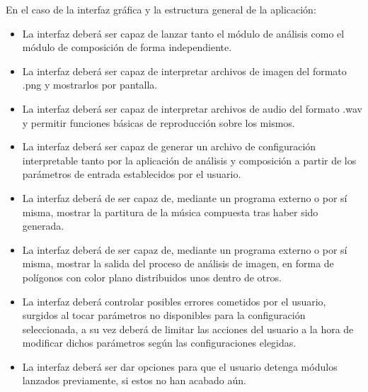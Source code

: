 	En el caso de la interfaz gráfica y la estructura general de la aplicación:

	 \begin{itemize}
		 \item La interfaz deberá ser capaz de lanzar tanto el módulo de análisis como el módulo de composición de forma independiente.
		 \item La interfaz deberá ser capaz de interpretar archivos de imagen del formato .png y mostrarlos por pantalla.
		 \item La interfaz deberá ser capaz de interpretar archivos de audio del formato .wav y permitir funciones básicas de reproducción sobre los mismos.
		 \item La interfaz deberá ser capaz de generar un archivo de configuración interpretable tanto por la aplicación de análisis y composición a partir de los parámetros de entrada establecidos por el usuario.
		 \item La interfaz deberá de ser capaz de, mediante un programa externo o por sí misma, mostrar la partitura de la música compuesta tras haber sido generada.
		 \item La interfaz deberá de ser capaz de, mediante un programa externo o por sí misma, mostrar la salida del proceso de análisis de imagen, en forma de polígonos con color plano distribuidos unos dentro de otros.
		 \item La interfaz deberá controlar posibles errores cometidos por el usuario, surgidos al tocar parámetros no disponibles para la configuración seleccionada, a su vez deberá de limitar las acciones del usuario a la hora de modificar dichos parámetros según las configuraciones elegidas.
		 \item La interfaz deberá ser dar opciones para que el usuario detenga módulos lanzados previamente, si estos no han acabado aún.
	 \end{itemize}
 
